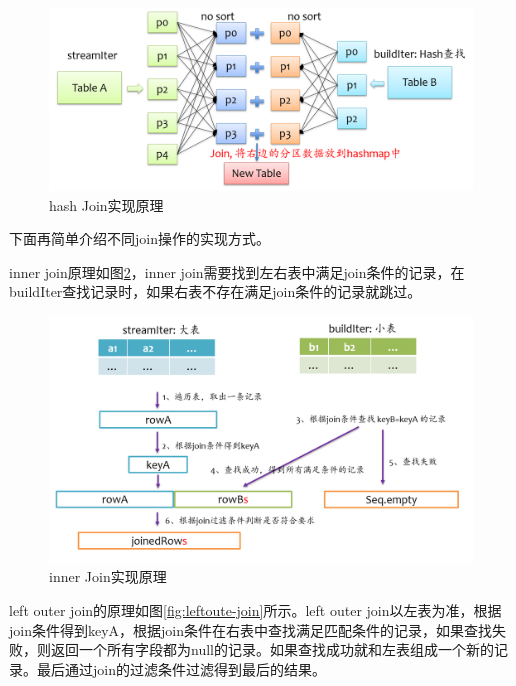 \begin{figure}
    \centering
    \includegraphics[width=1\textwidth]{Img/spark-sql-hash-join.png}
    \caption{hash Join实现原理}
    \label{fig:hash-join}
\end{figure}

下面再简单介绍不同join操作的实现方式。

inner join原理如图\ref{fig:inner-join}，inner join需要找到左右表中满足join条件的记录，在buildIter查找记录时，如果右表不存在满足join条件的记录就跳过。

\begin{figure}
    \centering
    \includegraphics[width=1\textwidth]{Img/spark-sql-inner-join.png}
    \caption{inner Join实现原理}
    \label{fig:inner-join}
\end{figure}

left outer join的原理如图\ref{fig:leftoute-join}所示。left outer join以左表为准，根据join条件得到keyA，根据join条件在右表中查找满足匹配条件的记录，如果查找失败，则返回一个所有字段都为null的记录。如果查找成功就和左表组成一个新的记录。最后通过join的过滤条件过滤得到最后的结果。

